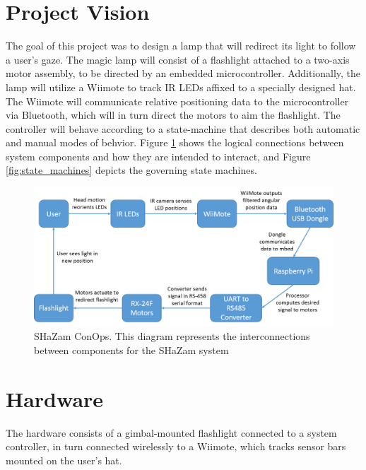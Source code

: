 \documentclass[conference, twocolumn]{IEEEtran}
\begin{document}
\section{Project Vision}

The goal of this project was to design a lamp that will redirect its light to follow a user's gaze. The magic lamp will consist of a flashlight attached to a two-axis motor assembly, to be directed by an embedded microcontroller. Additionally, the lamp will utilize a Wiimote to track IR LEDs affixed to a specially designed hat. The Wiimote will communicate relative positioning data to the microcontroller via Bluetooth, which will in turn direct the motors to aim the flashlight. The controller will behave according to a state-machine that describes both automatic and manual modes of behvior. Figure \ref{fig:conops} shows the logical connections between system components and how they are intended to interact, and Figure \ref{fig:state_machines} depicts the governing state machines.

\begin{figure}[!t]
\begin{center}
\includegraphics[width=\linewidth]{../images/conops_update}
\end{center}

\caption{SHaZam ConOps. This diagram represents the interconnections between components for the SHaZam system}
\label{fig:conops}
\end{figure}

\section{Hardware}
\label{sec:hardware}
The hardware consists of a gimbal-mounted flashlight connected to a system controller, in turn connected wirelessly to a Wiimote, which tracks sensor bars mounted on the user's hat.
\end{document}

